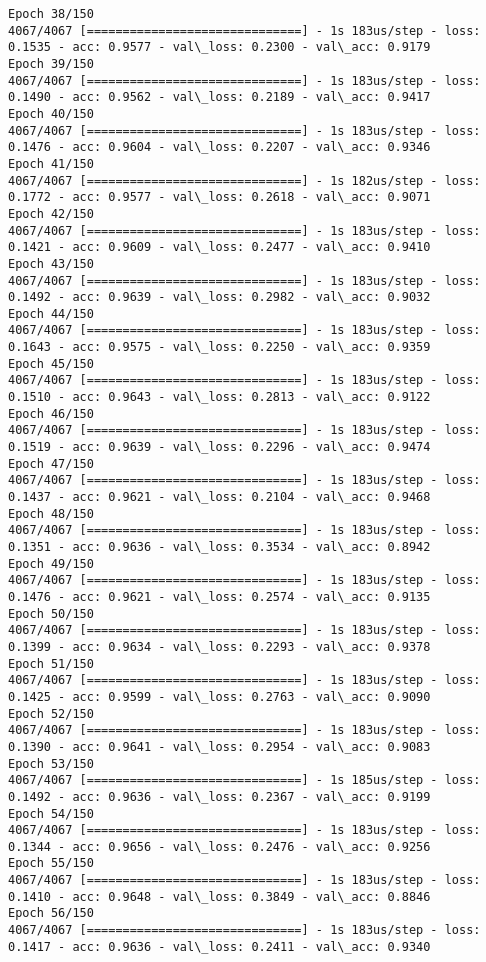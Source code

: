 \documentclass[11pt]{article}
\begin{document}
\begin{Verbatim}[commandchars=\\\{\}]
Epoch 38/150
4067/4067 [==============================] - 1s 183us/step - loss: 0.1535 - acc: 0.9577 - val\_loss: 0.2300 - val\_acc: 0.9179
Epoch 39/150
4067/4067 [==============================] - 1s 183us/step - loss: 0.1490 - acc: 0.9562 - val\_loss: 0.2189 - val\_acc: 0.9417
Epoch 40/150
4067/4067 [==============================] - 1s 183us/step - loss: 0.1476 - acc: 0.9604 - val\_loss: 0.2207 - val\_acc: 0.9346
Epoch 41/150
4067/4067 [==============================] - 1s 182us/step - loss: 0.1772 - acc: 0.9577 - val\_loss: 0.2618 - val\_acc: 0.9071
Epoch 42/150
4067/4067 [==============================] - 1s 183us/step - loss: 0.1421 - acc: 0.9609 - val\_loss: 0.2477 - val\_acc: 0.9410
Epoch 43/150
4067/4067 [==============================] - 1s 183us/step - loss: 0.1492 - acc: 0.9639 - val\_loss: 0.2982 - val\_acc: 0.9032
Epoch 44/150
4067/4067 [==============================] - 1s 183us/step - loss: 0.1643 - acc: 0.9575 - val\_loss: 0.2250 - val\_acc: 0.9359
Epoch 45/150
4067/4067 [==============================] - 1s 183us/step - loss: 0.1510 - acc: 0.9643 - val\_loss: 0.2813 - val\_acc: 0.9122
Epoch 46/150
4067/4067 [==============================] - 1s 183us/step - loss: 0.1519 - acc: 0.9639 - val\_loss: 0.2296 - val\_acc: 0.9474
Epoch 47/150
4067/4067 [==============================] - 1s 183us/step - loss: 0.1437 - acc: 0.9621 - val\_loss: 0.2104 - val\_acc: 0.9468
Epoch 48/150
4067/4067 [==============================] - 1s 183us/step - loss: 0.1351 - acc: 0.9636 - val\_loss: 0.3534 - val\_acc: 0.8942
Epoch 49/150
4067/4067 [==============================] - 1s 183us/step - loss: 0.1476 - acc: 0.9621 - val\_loss: 0.2574 - val\_acc: 0.9135
Epoch 50/150
4067/4067 [==============================] - 1s 183us/step - loss: 0.1399 - acc: 0.9634 - val\_loss: 0.2293 - val\_acc: 0.9378
Epoch 51/150
4067/4067 [==============================] - 1s 183us/step - loss: 0.1425 - acc: 0.9599 - val\_loss: 0.2763 - val\_acc: 0.9090
Epoch 52/150
4067/4067 [==============================] - 1s 183us/step - loss: 0.1390 - acc: 0.9641 - val\_loss: 0.2954 - val\_acc: 0.9083
Epoch 53/150
4067/4067 [==============================] - 1s 185us/step - loss: 0.1492 - acc: 0.9636 - val\_loss: 0.2367 - val\_acc: 0.9199
Epoch 54/150
4067/4067 [==============================] - 1s 183us/step - loss: 0.1344 - acc: 0.9656 - val\_loss: 0.2476 - val\_acc: 0.9256
Epoch 55/150
4067/4067 [==============================] - 1s 183us/step - loss: 0.1410 - acc: 0.9648 - val\_loss: 0.3849 - val\_acc: 0.8846
Epoch 56/150
4067/4067 [==============================] - 1s 183us/step - loss: 0.1417 - acc: 0.9636 - val\_loss: 0.2411 - val\_acc: 0.9340

\end{Verbatim}
\end{document}
